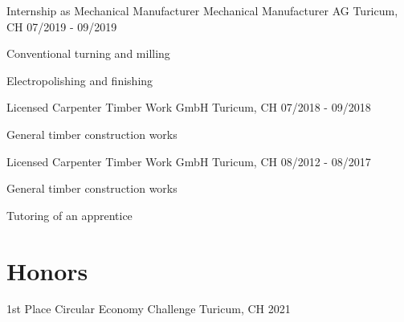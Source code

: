 \documentclass[rightPos]{ReCeiVe}      %
\begin{document}
\cventry
{Internship as Mechanical Manufacturer} %
{Mechanical Manufacturer AG} %
{Turicum, CH} %
{07/2019 - 09/2019} %
\begin{cvitems}
\item {Conventional turning and milling}
\item {Electropolishing and finishing}
\end{cvitems}

\cventry
{Licensed Carpenter} %
{Timber Work GmbH} %
{Turicum, CH} %
{07/2018 - 09/2018} %
\begin{cvitems}
\item {General timber construction works}
\end{cvitems}

\cventry
{Licensed Carpenter} %
{Timber Work GmbH} %
{Turicum, CH} %
{08/2012 - 08/2017} %
\begin{cvitems}
\item {General timber construction works}
\item {Tutoring of an apprentice}
\end{cvitems}

\section{Honors}
\begin{cvhonors}

\cvhonor
{1st Place} %
{Circular Economy Challenge} %
{Turicum, CH} %
{2021} %

\end{cvhonors}


\end{document}
